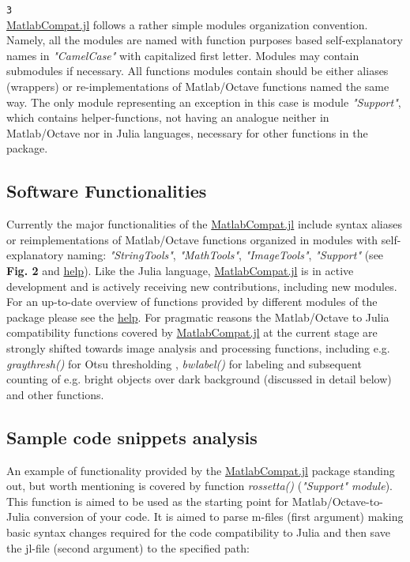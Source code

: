 \verb|3|\\


\href{https://github.com/MatlabCompat/MatlabCompat.jl}{MatlabCompat.jl} follows a rather simple modules organization convention. Namely, all the modules are named with function purposes based self-explanatory names in \textit{"CamelCase"} with capitalized first letter. Modules may contain submodules if necessary. All functions modules contain should be either aliases (wrappers) or re-implementations of Matlab/Octave functions named the same way. The only module representing an exception in this case is module \textit{"Support"}, which contains helper-functions, not having an analogue neither in Matlab/Octave nor in Julia languages, necessary for other functions in the package.

\subsection{Software Functionalities}

Currently the major functionalities of the \href{https://github.com/MatlabCompat/MatlabCompat.jl}{MatlabCompat.jl} include syntax aliases or reimplementations of Matlab/Octave functions organized in modules with self-explanatory naming: \textit{"StringTools"}, \textit{"MathTools"}, \textit{"ImageTools"}, \textit{"Support"} (see \textbf{Fig. 2} and \href{http://matlabcompat.github.io/help.html}{help}). Like the Julia language, \href{https://github.com/MatlabCompat/MatlabCompat.jl}{MatlabCompat.jl} is in active development and is actively receiving new contributions, including new modules. For an up-to-date overview of functions provided by different modules of the package please see the \href{http://matlabcompat.github.io/help.html}{help}. For pragmatic reasons the Matlab/Octave to Julia compatibility functions covered by \href{https://github.com/MatlabCompat/MatlabCompat.jl}{MatlabCompat.jl} at the current stage are strongly shifted towards image analysis and processing functions, including e.g. \textit{graythresh()} for Otsu thresholding \cite{otsu1975threshold}, \textit{bwlabel()} for labeling and subsequent counting of e.g. bright objects over dark background (discussed in detail below) and other functions.

\subsection{Sample code snippets analysis}

An example of functionality provided by the \href{https://github.com/MatlabCompat/MatlabCompat.jl}{MatlabCompat.jl} package standing out, but worth mentioning is covered by function \textit{rossetta()} (\textit{"Support" module}). This function is aimed to be used as the starting point for Matlab/Octave-to-Julia conversion of your code. It is aimed to parse m-files (first argument) making basic syntax changes required for the code compatibility to Julia and then save the jl-file (second argument) to the specified path:\\


